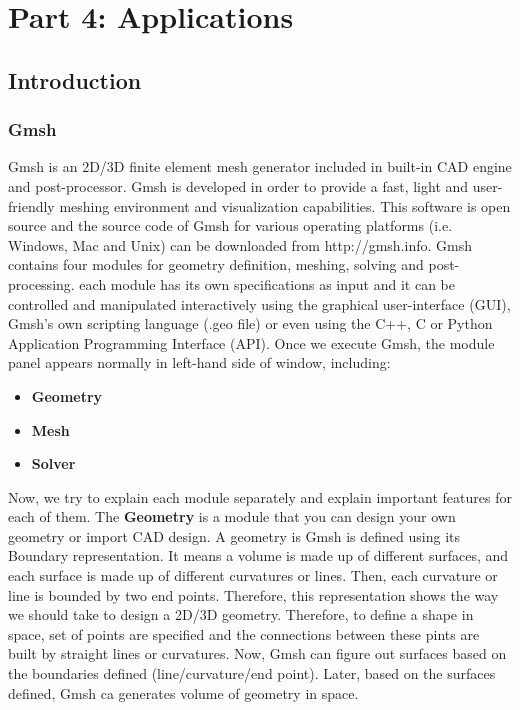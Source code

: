 \part{Part 4: Applications}

\graphicspath{ {./Pictures/} }

\chapter{Introduction}
\label{ch:intro for tutorials}
\section{Gmsh}
Gmsh is an 2D/3D finite element mesh generator included in built-in CAD engine and post-processor. Gmsh is developed in order to provide a fast, light and user-friendly meshing environment and visualization capabilities. This software is open source and the source code of Gmsh for various operating platforms (i.e. Windows, Mac and Unix) can be downloaded from http://gmsh.info. Gmsh contains four modules for geometry definition, meshing, solving and post-processing. each module has its own specifications as input and it can be controlled and manipulated interactively using the graphical user-interface (GUI), Gmsh's own scripting language (.geo file) or even using the C++, C or Python Application Programming Interface (API).
Once we execute Gmsh, the module panel appears normally in left-hand side of window, including:
\begin{itemize}
    \item \textbf{Geometry}
    \item \textbf{Mesh}
    \item \textbf{Solver}
\end{itemize}
Now, we try to explain each module separately and explain important features for each of them. The \textbf{Geometry} is a module that you can design your own geometry or import CAD design. A geometry is Gmsh is defined using its Boundary representation. It means a volume is made up of different surfaces, and each surface is made up of different curvatures or lines. Then, each curvature or line is bounded by two end points. Therefore, this representation shows the way we should take to design a 2D/3D geometry.
Therefore, to define a shape in space, set of points are specified and the connections between these pints are built by straight lines or curvatures. Now, Gmsh can figure out surfaces based on the boundaries defined (line/curvature/end point). Later, based on the surfaces defined, Gmsh ca generates volume of geometry in space.


